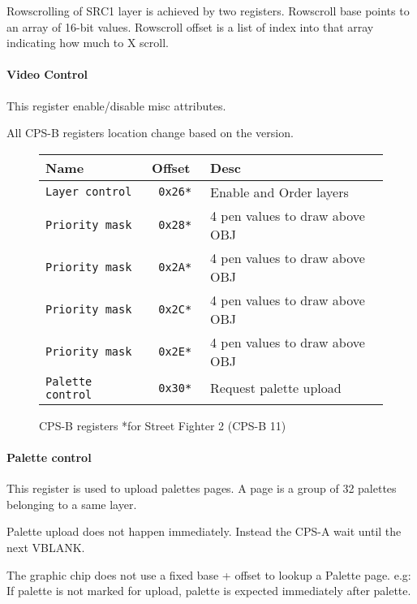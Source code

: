 Rowscrolling of SRC1 layer is achieved by two registers. Rowscroll base points to an array of 16-bit values. Rowscroll offset is a list of index into that array indicating how much to X scroll.


\paragraph{Video Control} This register enable/disable misc attributes.

 


\pagebreak

All CPS-B registers location change based on the version.

 \begin{figure}[H]
\begin{tabularx}{\textwidth}{llX}
  \toprule    
  \textbf{Name } & \textbf{ Offset }  & \textbf{Desc }\\  
  \toprule   
  \texttt{Layer control} & \texttt{ 0x26* } & Enable and Order layers\\      
\texttt{Priority mask} & \texttt{ 0x28* } &  4 pen values to draw above OBJ   \\  
\texttt{Priority mask} & \texttt{ 0x2A* } &  4 pen values to draw above OBJ   \\  
\texttt{Priority mask} & \texttt{ 0x2C* } &  4 pen values to draw above OBJ   \\  
\texttt{Priority mask} & \texttt{ 0x2E* } &  4 pen values to draw above OBJ  \\  
\texttt{Palette control} & \texttt{ 0x30* } &  Request palette upload\\ 
  \toprule   
\end{tabularx}
\caption*{CPS-B registers *for Street Fighter 2	(CPS-B 11)}
\end{figure}

\paragraph{Palette control}This register is used to upload palettes pages. A page is a group of 32 palettes belonging to a same layer.

 

Palette upload does not happen immediately. Instead the CPS-A wait until the next VBLANK.

The graphic chip does not use a fixed base + offset to lookup a Palette page. e.g: If  palette is not marked for upload,  palette is expected immediately after  palette.




